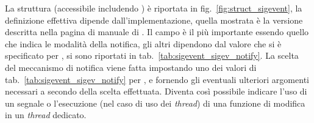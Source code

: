 La struttura  (accessibile includendo ) è
riportata in fig.~\ref{fig:struct_sigevent}, la definizione effettiva dipende
dall'implementazione, quella mostrata è la versione descritta nella pagina di
manuale di . Il campo  è il più
importante essendo quello che indica le modalità della notifica, gli altri
dipendono dal valore che si è specificato per , si sono
riportati in tab.~\ref{tab:sigevent_sigev_notify}. La scelta del meccanismo di
notifica viene fatta impostando uno dei valori di
tab.~\ref{tab:sigevent_sigev_notify} per , e fornendo gli
eventuali ulteriori argomenti necessari a secondo della scelta
effettuata. Diventa così possibile indicare l'uso di un segnale o l'esecuzione
(nel caso di uso dei \textit{thread}) di una funzione di modifica in un
\textit{thread} dedicato.

